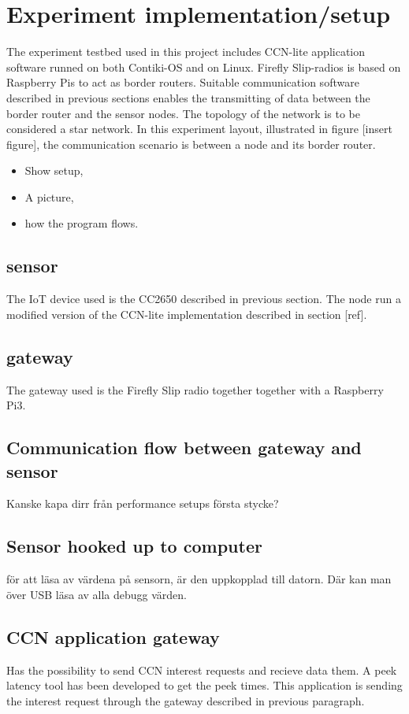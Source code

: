 \section{Experiment implementation/setup}
The experiment testbed used in this project includes CCN-lite application software runned on both Contiki-OS and on Linux. Firefly Slip-radios is based on Raspberry Pis to act as border routers. Suitable communication software described in previous sections enables the transmitting of data between the border router and the sensor nodes. The topology of the network is to be considered a star network. In this experiment layout, illustrated in figure [insert figure], the communication scenario is between a node and its border router.



\begin{itemize}
	\item Show setup,
	\item A picture,
	\item how the program flows.

\end{itemize}
\subsection{sensor}
The IoT device used is the CC2650 described in previous section. The node run a modified version of the CCN-lite implementation described in section [ref].

\subsection{gateway}
The gateway used is the Firefly Slip radio together together with a Raspberry Pi3. 


\subsection{Communication flow between gateway and sensor}
Kanske kapa dirr från performance setups första stycke?

\subsection{Sensor hooked up to computer}
för att läsa av värdena på sensorn, är den uppkopplad till datorn. Där kan man över USB läsa av alla debugg värden.

\subsection{CCN application gateway}
Has the possibility to send CCN interest requests and recieve data them. A peek latency tool has been developed to get the peek times.
This application is sending the interest request through the gateway described in previous paragraph.

